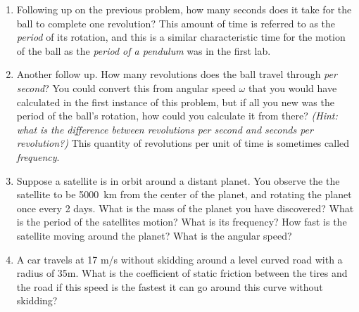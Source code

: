 \begin{enumerate}
\item
Following up on the previous problem, how many seconds does it take for the ball to complete one revolution? This amount of time is referred to as the \emph{period} of its rotation, and this is a similar characteristic time for the motion of the ball as the \emph{period of a pendulum} was in the first lab.\hugeskip

\item 
Another follow up. How many revolutions does the ball travel through \emph{per second}? You could convert this from angular speed $\omega$ that you would have calculated in the first instance of this problem, but if all you new was the period of the ball's rotation, how could you calculate it from there? \emph{(Hint: what is the difference between revolutions per second and seconds per revolution?)} This quantity of revolutions per unit of time is sometimes called \emph{frequency}.\hugeskip

\item 
Suppose a satellite is in orbit around a distant planet. You observe the the satellite to be \SI{5000}{\kilo\meter} from the center of the planet, and rotating the planet once every 2 days. What is the mass of the planet you have discovered? What is the period of the satellites motion? What is its frequency? How fast is the satellite moving around the planet? What is the angular speed?
\bigskip

\item
A car travels at 17 m/s without skidding around a level curved road with a radius of 35m. What is the coefficient of static friction between the tires and the road if this speed is the fastest it can go around this curve without skidding?


\end{enumerate}
